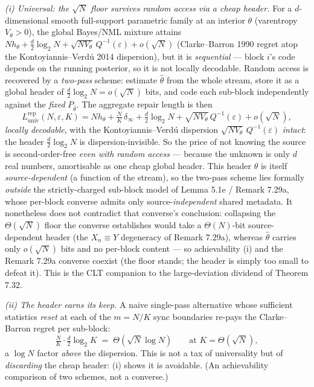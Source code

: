 \documentclass[
]{article}
\begin{document}
\emph{(i) Universal: the $\sqrt N$ floor survives random access via a cheap header.}
For a $d$-dimensional smooth full-support parametric family at an interior $\theta$
(varentropy $V_\theta>0$), the global Bayes/NML mixture attains
$N h_\theta+\tfrac d2\log_2 N+\sqrt{N V_\theta}\,Q^{-1}(\varepsilon)+o(\sqrt N)$
(Clarke--Barron 1990 regret atop the Kontoyiannis--Verd\'u 2014 dispersion), but it is
\emph{sequential} --- block $i$'s code depends on the running posterior, so it is not
locally decodable. Random access is recovered by a \emph{two-pass} scheme: estimate
$\hat\theta$ from the whole stream, store it as a global header of
$\tfrac d2\log_2 N=o(\sqrt N)$ bits, and code each sub-block independently against the
\emph{fixed} $P_{\hat\theta}$. The aggregate repair length is then
\[
  L^{\mathrm{rep}}_{\mathrm{univ}}(N,\varepsilon,K)
  = N h_\theta + \tfrac NK\,\delta_\infty + \tfrac d2\log_2 N
    + \sqrt{N V_\theta}\,Q^{-1}(\varepsilon) + o(\sqrt N),
\]
\emph{locally decodable}, with the Kontoyiannis--Verd\'u dispersion
$\sqrt{N V_\theta}\,Q^{-1}(\varepsilon)$ \emph{intact}: the header
$\tfrac d2\log_2 N$ is dispersion-invisible. So the price of not knowing the source is
second-order-free \emph{even with random access} --- because the unknown is only $d$
real numbers, amortisable as one cheap global header. This header $\hat\theta$ is itself
\emph{source-dependent} (a function of the stream), so the two-pass scheme lies formally
\emph{outside} the strictly-charged sub-block model of Lemma 5.1e / Remark 7.29a, whose
per-block converse admits only source-\emph{independent} shared metadata. It nonetheless
does not contradict that converse's conclusion: collapsing the $\Theta(\sqrt N)$ floor
the converse establishes would take a $\Theta(N)$-bit source-dependent header (the
$X_n\equiv Y$ degeneracy of Remark 7.29a), whereas $\hat\theta$ carries only
$o(\sqrt N)$ bits and no per-block content --- so achievability (i) and the Remark 7.29a
converse coexist (the floor stands; the header is simply too small to defeat it). This
is the CLT companion to the large-deviation dividend of Theorem 7.32.

\emph{(ii) The header earns its keep.} A naive single-pass alternative whose
sufficient statistics \emph{reset} at each of the $m=N/K$ sync boundaries re-pays the
Clarke--Barron regret per sub-block:
\[
  \tfrac NK\cdot\tfrac d2\log_2 K \;=\; \Theta(\sqrt N\log N)
  \qquad\text{at } K=\Theta(\sqrt N),
\]
a $\log N$ factor \emph{above} the dispersion. This is not a tax of universality but of
\emph{discarding} the cheap header: (i) shows it is avoidable. (An achievability
comparison of two schemes, not a converse.)
\end{document}

